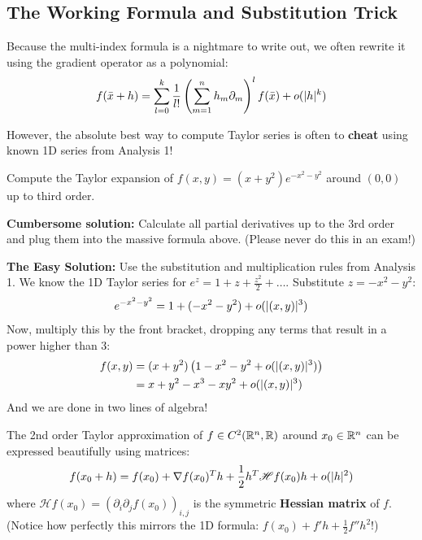 \subsection*{The Working Formula and Substitution Trick}
Because the multi-index formula is a nightmare to write out, we often rewrite it using the gradient operator as a polynomial:
\[ f(\bar{x} + h) = \sum_{l=0}^k \frac{1}{l!} \left( \sum_{m=1}^n h_m \partial_m \right)^l f(\bar{x}) + o(\lvert h\rvert^k) \]

However, the absolute best way to compute Taylor series is often to \textbf{cheat} using known 1D series from Analysis 1!

\begin{exercise*}
Compute the Taylor expansion of $f(x,y) = (x + y^2)e^{-x^2-y^2}$ around $(0,0)$ up to third order.
\end{exercise*}

\begin{solution}
\textbf{Cumbersome solution:} Calculate all partial derivatives up to the 3rd order and plug them into the massive formula above. \textcolor{eDarkRed}{(Please never do this in an exam!)}

\textbf{The Easy Solution:} Use the substitution and multiplication rules from Analysis 1. We know the 1D Taylor series for $e^z = 1 + z + \frac{z^2}{2} + \dots$. Substitute $z = -x^2 - y^2$:
\[ e^{-x^2-y^2} = 1 + (-x^2 - y^2) + o(\lvert(x,y)\rvert^3) \]
Now, multiply this by the front bracket, dropping any terms that result in a power higher than 3:
\begin{equation}
    \begin{aligned}
        f(x,y) &= (x + y^2) \left( 1 - x^2 - y^2 + o(\lvert(x,y)\rvert^3) \right) \\
        &= x + y^2 - x^3 - xy^2 + o(\lvert(x,y)\rvert^3)
    \end{aligned}
\end{equation}
And we are done in two lines of algebra!
\end{solution}

\vspace{0.5cm}
\begin{remark}
The 2nd order Taylor approximation of $f \in C^2(\mathbb{R}^n, \mathbb{R})$ around $x_0 \in \mathbb{R}^n$ can be expressed beautifully using matrices:
\[ f(x_0 + h) = f(x_0) + \nabla f(x_0)^T h + \frac{1}{2} h^T \mathscr{H}f(x_0) h + o(\lvert h\rvert^2) \]
where $\mathscr{H}f(x_0) = (\partial_i \partial_j f(x_0))_{i,j}$ is the symmetric \textbf{Hessian matrix} of $f$. 
\textcolor{eGray}{(Notice how perfectly this mirrors the 1D formula: $f(x_0) + f' h + \frac{1}{2}f'' h^2$!)}
\end{remark}
